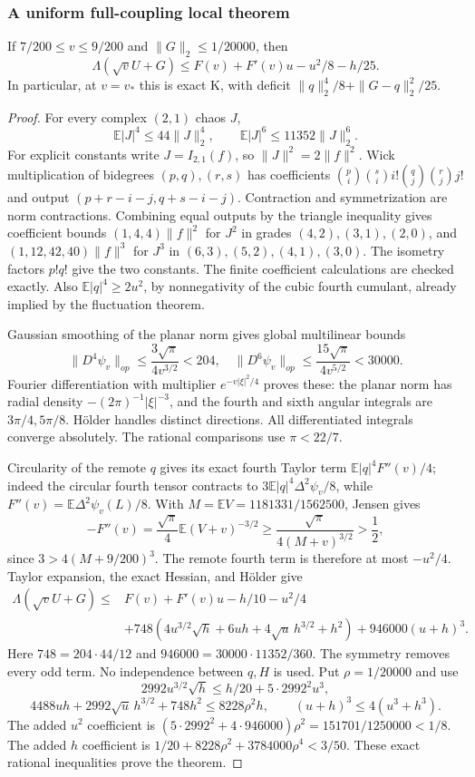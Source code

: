 \subsubsection{A uniform full-coupling local theorem}
\begin{theorem}\label{thm:full-buffer-local}
If $7/200\le v\le9/200$ and $\|G\|_2\le1/20000$, then
\[
 \boxed{\Lambda(\sqrt vU+G)
 \le F(v)+F'(v)u-u^2/8-h/25.}
\]
In particular, at $v=v_*$ this is exact K, with deficit
$\|q\|_2^4/8+\|G-q\|_2^2/25$.
\end{theorem}
\begin{proof}
For every complex $(2,1)$ chaos $J$,
\[
 \mathbb E|J|^4\le44\|J\|_2^4,
 \qquad\mathbb E|J|^6\le11352\|J\|_2^6.
\]
For explicit constants write $J=I_{2,1}(f)$, so $\|J\|^2=2\|f\|^2$.
Wick multiplication of bidegrees $(p,q),(r,s)$ has coefficients
$\binom pi\binom si i!\binom qj\binom rj j!$ and output
$(p+r-i-j,q+s-i-j)$. Contraction and symmetrization are norm
contractions. Combining equal outputs by the triangle inequality gives
coefficient bounds $(1,4,4)\|f\|^2$ for $J^2$ in grades
$(4,2),(3,1),(2,0)$, and $(1,12,42,40)\|f\|^3$ for $J^3$ in
$(6,3),(5,2),(4,1),(3,0)$. The isometry factors $p!q!$ give the two
constants. The finite coefficient calculations are checked exactly.
Also $\mathbb E|q|^4\ge2u^2$, by nonnegativity of the cubic fourth
cumulant, already implied by the fluctuation theorem.

Gaussian smoothing of the planar norm gives global multilinear bounds
\[
 \|D^4\psi_v\|_{op}\le\frac{3\sqrt\pi}{4v^{3/2}}<204,
 \quad\|D^6\psi_v\|_{op}\le\frac{15\sqrt\pi}{4v^{5/2}}<30000.
\]
Fourier differentiation with multiplier $e^{-v|\xi|^2/4}$ proves these:
the planar norm has radial density $-(2\pi)^{-1}|\xi|^{-3}$, and the
fourth and sixth angular integrals are $3\pi/4,5\pi/8$. H\"older
handles distinct directions. All differentiated integrals converge
absolutely. The rational comparisons use $\pi<22/7$.

Circularity of the remote $q$ gives its exact fourth Taylor term
$\mathbb E|q|^4F''(v)/4$; indeed the circular fourth tensor contracts
to $3\mathbb E|q|^4\Delta^2\psi_v/8$, while
$F''(v)=\mathbb E\Delta^2\psi_v(L)/8$.
With $M=\mathbb EV=1181331/1562500$, Jensen gives
\[
 -F''(v)=\frac{\sqrt\pi}{4}\mathbb E(V+v)^{-3/2}
 \ge\frac{\sqrt\pi}{4(M+v)^{3/2}}>\frac12,
\]
since $3>4(M+9/200)^3$. The remote fourth term is therefore at most
$-u^2/4$. Taylor expansion, the exact Hessian, and H\"older give
\begin{align*}
 \Lambda(\sqrt vU+G)\le{}&F(v)+F'(v)u-h/10-u^2/4\\
 &+748(4u^{3/2}\sqrt h+6uh+4\sqrt u\,h^{3/2}+h^2)
 +946000(u+h)^3.
\end{align*}
Here $748=204\cdot44/12$ and $946000=30000\cdot11352/360$.
The symmetry removes every odd term. No independence between $q,H$
is used. Put $\rho=1/20000$ and use
\[
 2992u^{3/2}\sqrt h\le h/20+5\cdot2992^2u^3,
\]
\[
 4488uh+2992\sqrt u\,h^{3/2}+748h^2\le8228\rho^2h,
 \qquad (u+h)^3\le4(u^3+h^3).
\]
The added $u^2$ coefficient is
$(5\cdot2992^2+4\cdot946000)\rho^2=151701/1250000<1/8$.
The added $h$ coefficient is
$1/20+8228\rho^2+3784000\rho^4<3/50$.
These exact rational inequalities prove the theorem.
\end{proof}

